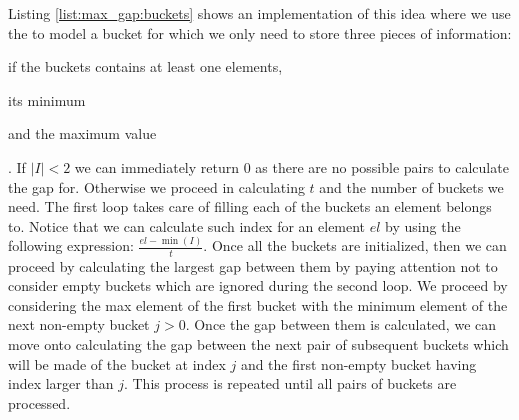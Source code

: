 Listing \ref{list:max_gap:buckets} shows an implementation of this idea where we use the
 to model a bucket for which we only need to store three pieces of information:
\begin{enumerate*}
	\item if the buckets contains at least one elements,
	\item its minimum
	\item and the maximum value
\end{enumerate*}.
If $|I| < 2$ we can immediately return $0$ as there are
no possible pairs to calculate the gap for. Otherwise we proceed in calculating $t$ and the number
of buckets we need. The first loop takes care of filling each of the buckets an element belongs to.
Notice that we can calculate such index for an element $el$ by using the following expression:
$\frac{el- \min(I)}{t}$. Once all the buckets are initialized, then we can proceed by calculating
the largest gap between them by paying attention not to consider empty buckets which are ignored
during the second loop. We proceed by considering the max element of the  first bucket with the
minimum element of the next non-empty bucket $j > 0$. Once the gap between them is calculated, we
can move onto calculating the gap between the next pair of subsequent buckets which will be made of
the bucket at index $j$ and the first non-empty bucket having index larger than $j$. This process is
repeated until all pairs of buckets are processed.
